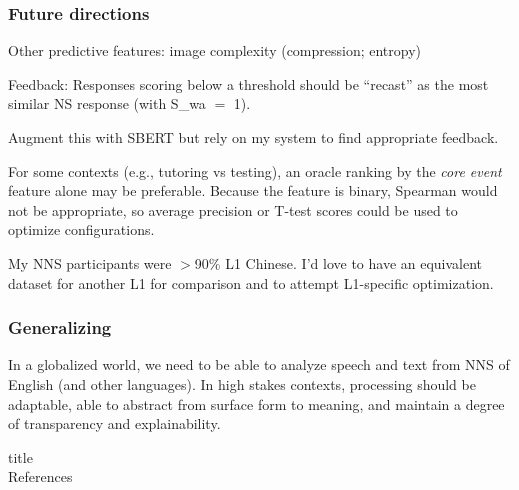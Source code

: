 \documentclass[xcolor={dvipsnames}]{beamer}
\begin{document}
\begin{frame}
\frametitle{Future directions}
Other predictive features: image complexity (compression; entropy)

\medskip

Feedback: Responses scoring below a threshold should be ``recast'' as the most similar NS response (with S_{wa} $=$ 1).

Augment this with SBERT but rely on my system to find appropriate feedback.

\medskip

For some contexts (e.g., tutoring vs testing), an oracle ranking by the \textit{core event} feature alone may be preferable. Because the feature is binary, Spearman would not be appropriate, so average precision or T-test scores could be used to optimize configurations.

\medskip

My NNS participants were $>$90\% L1 Chinese. I'd love to have an equivalent dataset for another L1 for comparison and to attempt L1-specific optimization.

\end{frame}

\begin{frame}
\frametitle{Generalizing}

In a globalized world, we need to be able to analyze speech and text from NNS of English (and other languages). In high stakes contexts, processing should be adaptable, able to abstract from surface form to meaning, and maintain a degree of transparency and explainability. 

\end{frame}



\begin{beamercolorbox}{title}
\mbox{}\\[1ex]%
References
\end{beamercolorbox}
\medskip
\scriptsize


\end{document}
